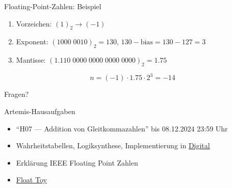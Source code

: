 \begin{frame}[c]{Floating-Point-Zahlen: Beispiel}
	\begin{center}
		\vspace{0.3cm}
		\begin{enumerate}
			\item Vorzeichen: $(1)_2 \rightarrow (-1)$
			\item Exponent: $(1000\;0010)_2 = 130$, $130-\textrm{bias} = 130-127 = 3$
			\item Mantisse: $(1.110\;0000\;0000\;0000\;0000)_2 = 1.75$
		\end{enumerate}
		\vspace{0.3cm}
		\Large
		\[
			n = (-1) \cdot 1.75 \cdot 2^3 = -14
		\]
	\end{center}
\end{frame}



\begin{frame}[c, fragile]{}{}
	\begin{center}
		\LARGE Fragen?
	\end{center}
\end{frame}

\begin{frame}[c, fragile]{Artemis-Hausaufgaben}{}
	\begin{itemize}
		\item \enquote{H07 --- Addition von Gleitkommazahlen} bis 08.12.2024 23:59 Uhr
		\item Wahrheitstabellen, Logiksynthese, Implementierung in \href{https://github.com/hneemann/Digital}{Digital}
		\item Erklärung IEEE Floating Point Zahlen
		\item \href{https://evanw.github.io/float-toy/l}{Float Toy}
	\end{itemize}
\end{frame}

